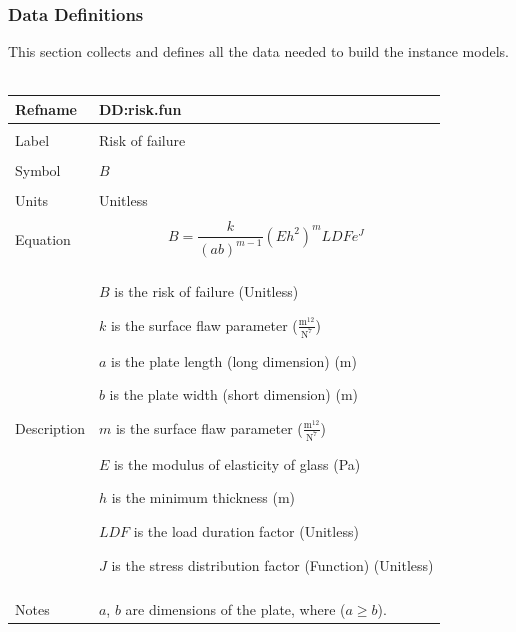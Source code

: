 \documentclass[12pt]{article}
\begin{document}
\subsubsection{Data Definitions}
\label{Sec:DDs}
This section collects and defines all the data needed to build the instance models.
~\newline
\noindent \begin{minipage}{\textwidth}
\begin{tabular}{p{} p{}}
\toprule \textbf{Refname} & \textbf{DD:risk.fun}
\label{DD:risk.fun}
\\ \midrule \\
Label & Risk of failure
\\ \midrule \\
Symbol & $B$
\\ \midrule \\
Units & Unitless
\\ \midrule \\
Equation & \begin{dmath}
           B=\frac{k}{\left(a b\right)^{m-1}} \left(E h^{2}\right)^{m} LDF e^{J}
           \end{dmath}
\\ \midrule \\
Description & \begin{symbDescription}
              \item{$B$ is the risk of failure (Unitless)}
              \item{$k$ is the surface flaw parameter ($\frac{\text{m}^{12}}{\text{N}^{7}}$)}
              \item{$a$ is the plate length (long dimension) (m)}
              \item{$b$ is the plate width (short dimension) (m)}
              \item{$m$ is the surface flaw parameter ($\frac{\text{m}^{12}}{\text{N}^{7}}$)}
              \item{$E$ is the modulus of elasticity of glass (Pa)}
              \item{$h$ is the minimum thickness (m)}
              \item{$LDF$ is the load duration factor (Unitless)}
              \item{$J$ is the stress distribution factor (Function) (Unitless)}
              \end{symbDescription}
\\ \midrule \\
Notes & $a$, $b$ are dimensions of the plate, where ($a\geq{}b$).

\end{tabular}
\end{minipage}
\end{document}
